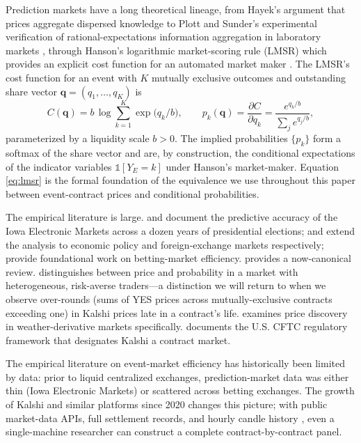 \documentclass[11pt]{article}
\begin{document}
Prediction markets have a long theoretical lineage, from Hayek's argument
that prices aggregate dispersed knowledge \citep{hayek1945knowledge} to
Plott and Sunder's experimental verification of rational-expectations
information aggregation in laboratory markets \citep{plott1988rational},
through Hanson's logarithmic market-scoring rule (LMSR) which provides
an explicit cost function for an automated market maker
\citep{hanson2003combinatorial,hanson2007logarithmic}. The LMSR's cost
function for an event with $K$ mutually exclusive outcomes and outstanding
share vector $\mathbf{q} = (q_1, \ldots, q_K)$ is
\begin{equation}
C(\mathbf{q}) = b \, \log\!\sum_{k=1}^{K} \exp\!\bigl(q_k / b\bigr),
\qquad p_k(\mathbf{q}) = \frac{\partial C}{\partial q_k} = \frac{e^{q_k/b}}{\sum_j e^{q_j/b}},
\label{eq:lmsr}
\end{equation}
parameterized by a liquidity scale $b > 0$. The implied probabilities
$\{p_k\}$ form a softmax of the share vector and are, by construction,
the conditional expectations of the indicator variables $\mathbb{1}[Y_E = k]$
under Hanson's market-maker. Equation \eqref{eq:lmsr} is the formal
foundation of the equivalence we use throughout this paper between
event-contract prices and conditional probabilities.

The empirical literature is large.
\citet{forsythe1992anatomy} and \citet{berg2008results} document the
predictive accuracy of the Iowa Electronic Markets across a dozen years
of presidential elections; \citet{snowberg2007political} and
\citet{leigh2013empirical} extend the analysis to economic policy and
foreign-exchange markets respectively;
\citet{ali1977probability,ottaviani2009surprised} provide foundational
work on betting-market efficiency. \citet{wolfers2004prediction} provides
a now-canonical review.
\citet{manski2006interpreting} distinguishes between price and probability
in a market with heterogeneous, risk-averse traders---a distinction we
will return to when we observe over-rounds (sums of YES prices across
mutually-exclusive contracts exceeding one) in Kalshi prices late in a
contract's life. \citet{taylor2017price} examines price discovery in
weather-derivative markets specifically. \citet{maccormack2024kalshi}
documents the U.S. CFTC regulatory framework that designates Kalshi a
contract market.

The empirical literature on event-market efficiency has historically been
limited by data: prior to liquid centralized exchanges, prediction-market
data was either thin (Iowa Electronic Markets) or scattered across betting
exchanges. The growth of Kalshi and similar platforms since 2020 changes
this picture; with public market-data APIs, full settlement records, and
hourly candle history \citep{kalshi_docs}, even a single-machine researcher
can construct a complete contract-by-contract panel.
\end{document}

